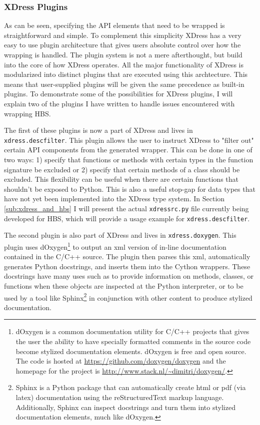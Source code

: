   \subsubsection{XDress Plugins} \label{ssub:xdress_plugins}

    As can be seen, specifying the API elements that need to be wrapped is straightforward and simple. To complement this simplicity XDress has a very easy to use plugin architecture that gives users absolute control over how the wrapping is handled. The plugin system is not a mere afterthought, but build into the core of how XDress operates. All the major functionality of XDress is modularized into distinct plugins that are executed using this archtecture. This means that user-supplied plugins will be given the same precedence as built-in plugins. To demonstrate some of the possibilities for XDress plugins, I will explain two of the plugins I have written to handle issues encountered with wrapping HBS.

    The first of these plugins is now a part of XDress and lives in \texttt{xdress.descfilter}. This plugin allows the user to instruct XDress to "filter out" certain API components from the generated wrapper. This can be done in one of two ways: 1) specify that functions or methods with certain types in the function signature be excluded or 2) specify that certain methods of a class should be excluded. This flexibility can be useful when there are certain functions that shouldn't be exposed to Python. This is also a useful stop-gap for data types that have not yet been implemented into the XDress type system. In Section \ref{sub:xdress_and_hbs} I will present the actual \texttt{xdressrc.py} file currently being developed for HBS, which will provide a usage example for \texttt{xdress.descfilter}.

    The second plugin is also part of XDress and lives in  \texttt{xdress.doxygen}. This plugin uses dOxygen\footnote{dOxygen is a common documentation utility for C/C++ projects that gives the user the ability to have specially formatted comments in the source code become stylized documentation elements. dOxygen is free and open source. The code is hosted at \url{https://github.com/doxygen/doxygen} and the homepage for the project is \url{http://www.stack.nl/~dimitri/doxygen/}.} to output an xml version of in-line documentation contained in the C/C++ source. The plugin then parses this xml, automatically generates Python docstrings, and inserts them into the Cython wrappers. These docstrings have many uses such as to provide information on methods, classes, or functions when these objects are inspected at the Python interpreter, or to be used by a tool like Sphinx\footnote{Sphinx is a Python package that can automatically create html or pdf (via latex) documentation using the reStructuredText markup language. Additionally, Sphinx can inspect docstrings and turn them into stylized documentation elements, much like dOxygen.} in conjunction with other content to produce stylized documentation.

